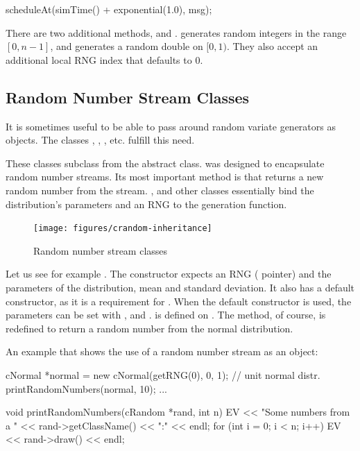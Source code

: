 \begin{cpp}
scheduleAt(simTime() + exponential(1.0), msg);
\end{cpp}

There are two additional methods,  and .
 generates random integers in the range $[0, n-1]$, and
 generates a random double on $[0,1)$. They also accept
an additional local RNG index that defaults to 0.

\subsection{Random Number Stream Classes}

It is sometimes useful to be able to pass around random variate generators
as objects. The classes , ,
, etc. fulfill this need.

These classes subclass from the  abstract class.
 was designed to encapsulate random number streams. Its
most important method is  that returns a new random number
from the stream. ,  and other classes
essentially bind the distribution's parameters and an RNG to the generation
function.

\begin{figure}[htbp]
  \begin{center}
    \texttt{[image: figures/crandom-inheritance]}
    \caption{Random number stream classes}
  \end{center}
\end{figure}

Let us see for example . The constructor expects an RNG
( pointer) and the parameters of the distribution, mean and
standard deviation. It also has a default constructor, as it is a
requirement for . When the default constructor
is used, the parameters can be set with , 
and .  is defined on .
The  method, of course, is redefined to return a random
number from the normal distribution.

An example that shows the use of a random number stream as an object:

\begin{cpp}
cNormal *normal = new cNormal(getRNG(0), 0, 1); // unit normal distr.
printRandomNumbers(normal, 10);
...

void printRandomNumbers(cRandom *rand, int n)
{
    EV << "Some numbers from a " << rand->getClassName() << ":" << endl;
    for (int i = 0; i < n; i++)
        EV << rand->draw() << endl;
}
\end{cpp}

